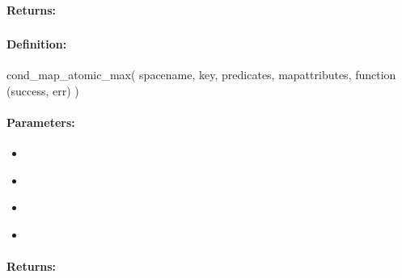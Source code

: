 \paragraph{Returns:}


\pagebreak
\subsubsection{}
\label{api:nodejs:cond_map_atomic_max}


\paragraph{Definition:}
\begin{javascriptcode}
cond_map_atomic_max(
        spacename, key, predicates, mapattributes, function (success, err) {})
\end{javascriptcode}
\paragraph{Parameters:}
\begin{itemize}[noitemsep]
\item {}\\

\item {}\\

\item {}\\

\item {}\\

\end{itemize}

\paragraph{Returns:}


\pagebreak
\subsubsection{}
\label{api:nodejs:search}


